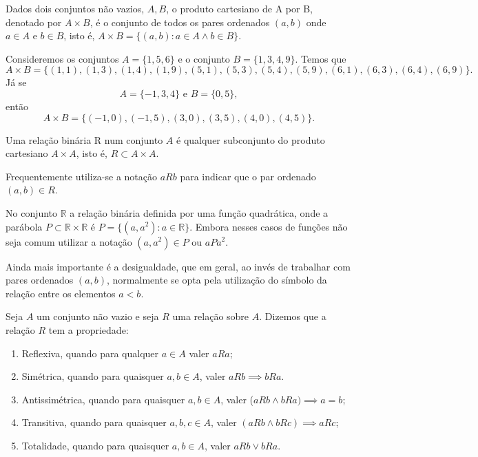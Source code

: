 \documentclass[../main.tex]{subfiles}
\begin{document}
\begin{defi}\label{agb-def-produtoCartesiano}
     Dados dois conjuntos não vazios, $A,B$, o produto cartesiano de A por B, denotado por $A \times B$, é o conjunto de todos os pares ordenados $(a,b)$ onde $a \in A$ e $b \in B$, isto é, $A \times B = \{ (a,b) : a \in A \land b \in B \}$.
\end{defi}
\begin{ex}
    Consideremos os conjuntos $A = \{1,5,6\}$ e o conjunto $B = \{1,3,4,9\}$. Temos que 
    \[ A \times B = \{(1,1), (1,3), (1,4), (1,9), (5,1), (5,3), (5,4), (5,9), (6,1), (6,3), (6,4), (6,9)\}.\] 
    Já se \[ A = \{-1,3,4\} \text{ e } B = \{0,5\},\] então 
    \[ A \times B = \{(-1,0), (-1,5), (3,0), (3,5), (4,0), (4,5)\}. \]
\end{ex}
    

\begin{defi}\label{agb-def-relacaoBinaria}
    Uma relação binária R num conjunto $A$ é qualquer subconjunto do produto cartesiano $A \times A$, isto é, $R \subset A \times A$.
\end{defi}

Frequentemente utiliza-se a notação $aRb$ para indicar que o par ordenado $(a,b) \in R$.

\begin{ex}
    No conjunto $\mathbb{R}$ a relação binária definida por uma função quadrática, onde a parábola $P \subset \mathbb{R} \times \mathbb{R}$ é $P = \{(a,a^2) : a \in \mathbb{R} \}$. Embora nesses casos de funções não seja comum utilizar a notação $(a,a^2) \in P$ ou $a P a^2$.    
\end{ex}
\begin{ex}
    Ainda mais importante é a desigualdade, que em geral, ao invés de trabalhar com pares ordenados $(a,b)$, normalmente se opta pela utilização do símbolo da relação entre os elementos $a<b$.     
\end{ex}

\begin{defi}
    Seja $A$ um conjunto não vazio e seja $R$ uma relação sobre $A$. Dizemos que a relação $R$ tem a propriedade:
    \begin{enumerate}[label=(\roman*)]
        \item Reflexiva, quando para qualquer $a \in A$ valer $aRa$;
        \item Simétrica, quando para quaisquer $a,b \in A$, valer $aRb \implies bRa$.
        \item Antissimétrica, quando para quaisquer $a,b \in A$, valer ($a R b \land bRa) \implies a = b$;
        \item Transitiva, quando para quaisquer $a,b,c \in A$, valer $(aRb \land bRc) \implies aRc$;
        \item Totalidade, quando para quaisquer $a,b \in A$, valer $aRb \lor bRa$.
    \end{enumerate}
\end{defi}
\end{document}

